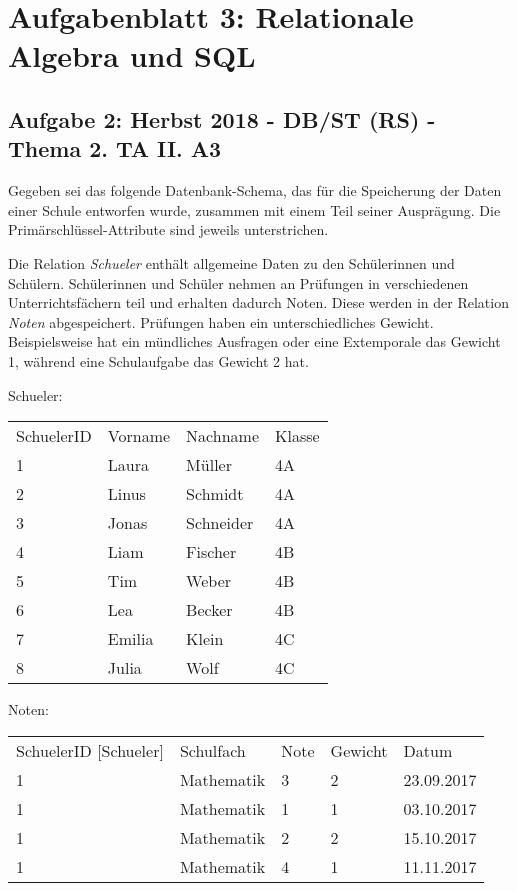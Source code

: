 \documentclass{lehramt-informatik-haupt}
\begin{document}
\chapter{Aufgabenblatt 3: Relationale Algebra und SQL}

%


%

\section{Aufgabe 2: Herbst 2018 - DB/ST (RS) - Thema 2. TA II. A3}

Gegeben sei das folgende Datenbank-Schema, das für die Speicherung der
Daten einer Schule entworfen wurde, zusammen mit einem Teil seiner
Ausprägung. Die Primärschlüssel-Attribute sind jeweils unterstrichen.

Die Relation \emph{Schueler} enthält allgemeine Daten zu den
Schülerinnen und Schülern. Schülerinnen und Schüler nehmen an Prüfungen
in verschiedenen Unterrichtsfächern teil und erhalten dadurch Noten.
Diese werden in der Relation \emph{Noten} abgespeichert. Prüfungen haben
ein unterschiedliches Gewicht. Beispielsweise hat ein mündliches
Ausfragen oder eine Extemporale das Gewicht 1, während eine Schulaufgabe
das Gewicht 2 hat.

Schueler:

\begin{tabular}{llll}
SchuelerID & Vorname & Nachname  & Klasse \\
1        & Laura   & Müller    & 4A     \\
2        & Linus   & Schmidt   & 4A     \\
3        & Jonas   & Schneider & 4A     \\
4        & Liam    & Fischer   & 4B     \\
5        & Tim     & Weber     & 4B     \\
6        & Lea     & Becker    & 4B     \\
7        & Emilia  & Klein     & 4C     \\
8        & Julia   & Wolf      & 4C
\end{tabular}

Noten:

\begin{tabular}{lllll}
SchuelerID {[}Schueler{]} & Schulfach  & Note & Gewicht & Datum      \\
1                         & Mathematik & 3    & 2       & 23.09.2017 \\
1                         & Mathematik & 1    & 1       & 03.10.2017 \\
1                         & Mathematik & 2    & 2       & 15.10.2017 \\
1                         & Mathematik & 4    & 1       & 11.11.2017
\end{tabular}
\end{document}
